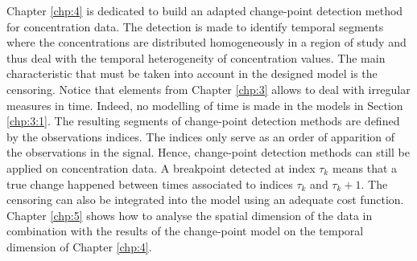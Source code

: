 Chapter \ref{chp:4} is dedicated to build an adapted change-point detection method for concentration data. The detection is made to identify temporal segments where the concentrations are distributed homogeneously in a region of study and thus deal with the temporal heterogeneity of concentration values. The main characteristic that must be taken into account in the designed model is the censoring. Notice that elements from Chapter \ref{chp:3} allows to deal with irregular measures in time. Indeed, no modelling of time is made in the models in Section \ref{chp:3:1}. The resulting segments of change-point detection methods are defined by the observations indices. The indices only serve as an order of apparition of the observations in the signal. Hence, change-point detection methods can still be applied on concentration data. A breakpoint detected at index $\tau_k$ means that a true change happened between times associated to indices $\tau_{k}$ and $\tau_{k}+1$. The censoring can also be integrated into the model using an adequate cost function. Chapter \ref{chp:5} shows how to analyse the spatial dimension of the data in combination with the results of the change-point model on the temporal dimension of Chapter \ref{chp:4}.        
